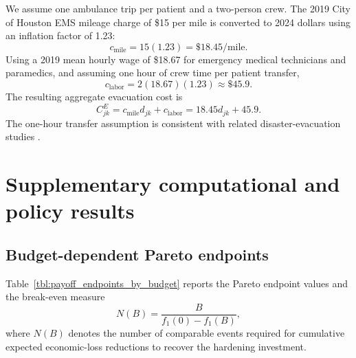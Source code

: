 \documentclass[preprint,11pt,authoryear]{elsarticle}
\begin{document}
We assume one ambulance trip per patient and a two-person crew. The 2019 City
of Houston EMS mileage charge of \$15 per mile is converted to 2024 dollars
using an inflation factor of 1.23:
\[
c_{\mathrm{mile}}
=
15(1.23)
=
\$18.45\text{/mile}.
\]
Using a 2019 mean hourly wage of \$18.67 for emergency medical technicians
and paramedics, and assuming one hour of crew time per patient transfer,
\[
c_{\mathrm{labor}}
=
2(18.67)(1.23)
\approx \$45.9.
\]
The resulting aggregate evacuation cost is
\[
C_{jk}^E
=
c_{\mathrm{mile}}d_{jk}
+
c_{\mathrm{labor}}
=
18.45d_{jk}+45.9.
\]
The one-hour transfer assumption is consistent with related
disaster-evacuation studies \citep{KIM2024104518}.



\section{Supplementary computational and policy results}

\subsection{Budget-dependent Pareto endpoints}

Table~\ref{tbl:payoff_endpoints_by_budget} reports the Pareto endpoint values
and the break-even measure
\[
N(B)=\frac{B}{f_1(0)-f_1(B)},
\]
where $N(B)$ denotes the number of comparable events required for cumulative
expected economic-loss reductions to recover the hardening investment.
\end{document}
